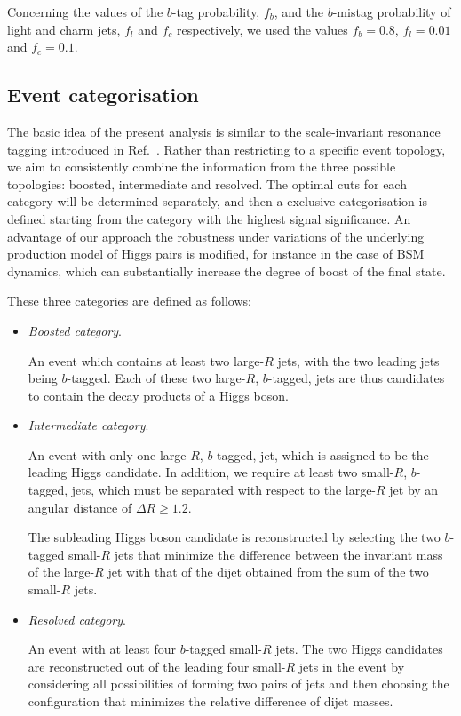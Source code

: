 Concerning the values of the $b$-tag probability, $f_b$, and
the $b$-mistag probability of light and charm jets, $f_l$ and  $f_c$
respectively,
we used the values $f_b=0.8$, $f_l=0.01$
and  $f_c=0.1$.


\subsection{Event categorisation}
\label{sec:categorisation}

The basic idea of the present analysis is similar to the
scale-invariant resonance tagging introduced
in Ref.~\cite{Gouzevitch:2013qca}.
%
Rather than restricting to a specific event topology,
we aim to consistently combine the information from
the three possible topologies: boosted, intermediate and
resolved.
%
The optimal cuts for each category will be determined
separately, and then
a exclusive categorisation is defined starting from the category
with the highest signal significance.
%
An advantage of our approach
the robustness under variations of
the underlying production model of Higgs pairs is modified,
for instance in the case of
BSM dynamics, which can substantially increase
the degree of boost of the final state.


These three categories are defined as follows:
\begin{itemize}
\item {\it Boosted category}.

  An event which
  contains at least two large-$R$ jets, with the two leading jets
 being $b$-tagged.
 Each of these two large-$R$, $b$-tagged, jets are 
 thus candidates
 to contain the decay products of a Higgs boson.

\item {\it Intermediate category}.

  An event with only one large-$R$, $b$-tagged, jet, which
  is assigned to be the leading Higgs candidate.
  In addition, we require at least two small-$R$, $b$-tagged, jets,
  which must be separated with respect to the large-$R$ jet
  by an angular distance of $\Delta R\ge 1.2$.
    
  The subleading Higgs boson candidate is reconstructed
  by selecting the two $b$-tagged small-$R$ jets that minimize the difference
  between the invariant mass of the large-$R$ jet
  with that of the dijet obtained
  from the sum of the two small-$R$ jets.
  
\item {\it Resolved category}.

  
 An event with at least
  four $b$-tagged small-$R$ jets.
  The two Higgs candidates are reconstructed out of the
  leading four small-$R$ jets in the event
  by considering all possibilities of forming two pairs of jets
  and then choosing the configuration that minimizes the relative difference of
  dijet masses.
  
\end{itemize}


